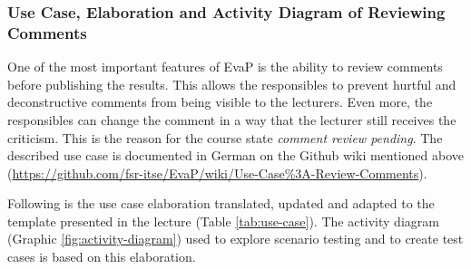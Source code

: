 \subsubsection{Use Case, Elaboration and Activity Diagram of Reviewing Comments}
One of the most important features of EvaP is the ability to review comments before publishing the results. 
This allows the responsibles to prevent hurtful and deconstructive comments from being visible to the lecturers.
Even more, the responsibles can change the comment in a way that the lecturer still receives the criticism.
This is the reason for the course state \emph{comment review pending}.
The described use case is documented in German on the Github wiki mentioned above 
(\url{https://github.com/fsr-itse/EvaP/wiki/Use-Case%3A-Review-Comments}).

Following is the use case elaboration translated, updated and adapted to the template presented in the lecture (Table \ref{tab:use-case}).
The activity diagram (Graphic \ref{fig:activity-diagram}) used to explore scenario testing and to create test cases is based on this elaboration.


